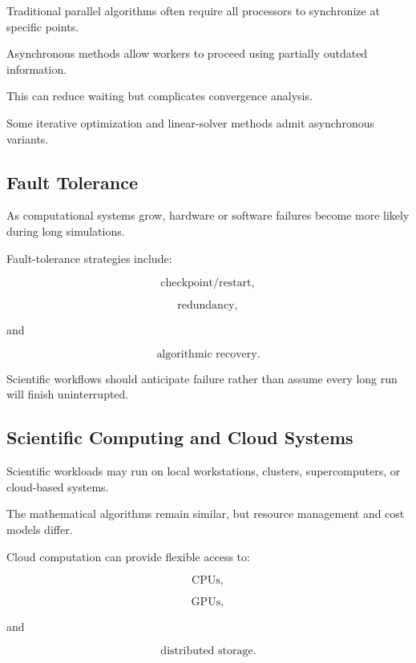 Traditional parallel algorithms often require all processors to synchronize
at specific points.

Asynchronous methods allow workers to proceed using partially outdated
information.

This can reduce waiting but complicates convergence analysis.

Some iterative optimization and linear-solver methods admit asynchronous
variants.

\subsection{Fault Tolerance}
\label{subsec:scientific-fault-tolerance}

As computational systems grow, hardware or software failures become more
likely during long simulations.

Fault-tolerance strategies include:

\[
\boxed{
\text{checkpoint/restart},
}
\]

\[
\boxed{
\text{redundancy},
}
\]

and

\[
\boxed{
\text{algorithmic recovery}.
}
\]

Scientific workflows should anticipate failure rather than assume every
long run will finish uninterrupted.

\subsection{Scientific Computing and Cloud Systems}
\label{subsec:scientific-cloud-computing}

Scientific workloads may run on local workstations, clusters,
supercomputers, or cloud-based systems.

The mathematical algorithms remain similar, but resource management and
cost models differ.

Cloud computation can provide flexible access to:

\[
\boxed{
\text{CPUs},
}
\]

\[
\boxed{
\text{GPUs},
}
\]

and

\[
\boxed{
\text{distributed storage}.
}
\]

